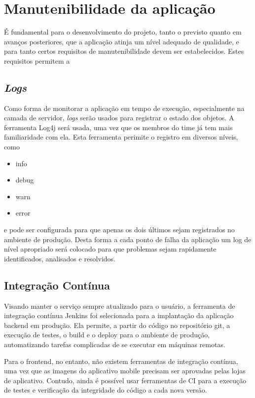 \section{Manutenibilidade da aplicação}

É fundamental para o desenvolvimento do projeto, tanto o previsto
quanto em avanços posteriores, que a aplicação atinja um nível adequado
de qualidade, e para tanto certos requisitos de manutenibilidade devem
ser estabelecidos.  Estes requisitos permitem a

\subsection{\emph{Logs}}

Como forma de monitorar a aplicação em tempo de execução,
especialmente na camada de servidor, \emph{logs} serão usados para
registrar o estado dos objetos. A ferramenta Log4j será usada, uma vez
que os membros do time já tem mais familiaridade com ela. Esta
ferramenta perimite o registro em diversos níveis, como
\begin{itemize}
  \em
\item info
\item debug
\item warn
\item error
\end{itemize}
e pode ser configurada para que apenas os dois últimos
sejam registrados no ambiente de produção. Desta forma a cada ponto de
falha da aplicação um log de nível apropriado será colocado para que
problemas sejam rapidamente identificados, analisados e resolvidos.

\subsection{Integração Contínua}

Visando manter o serviço sempre atualizado para o usuário, a
ferramenta de integração contínua Jenkins foi selecionada para a
implantação da aplicação \gls{backend} em produção. Ela
permite, a partir do código no repositório git, a execução de testes,
o build e o \gls{deploy} para o ambiente de produção, automatizando tarefas
complicadas de se executar em máquinas remotas.

Para o \gls{frontend}, no entanto, não existem ferramentas de
integração contínua, uma vez que as imagens do aplicativo mobile
precisam ser aprovadas pelas lojas de aplicativo. Contudo, ainda é
possível usar ferramentas de CI para a execução de testes e
verificação da integridade do código a cada nova versão.

